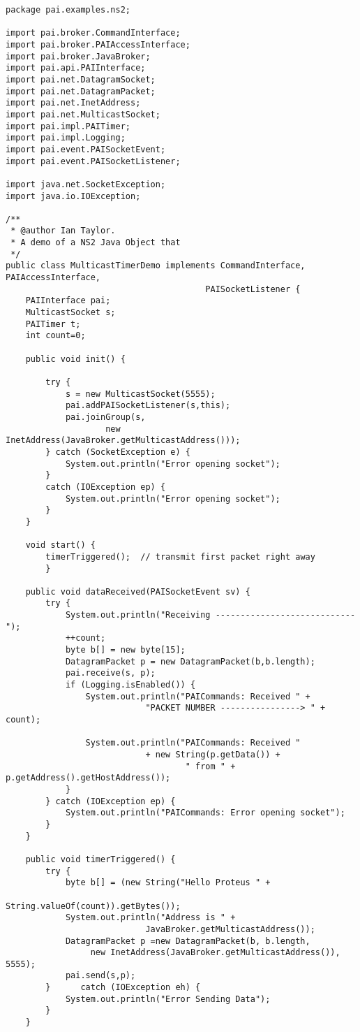 \footnotesize
\begin{verbatim}
package pai.examples.ns2;

import pai.broker.CommandInterface;
import pai.broker.PAIAccessInterface;
import pai.broker.JavaBroker;
import pai.api.PAIInterface;
import pai.net.DatagramSocket;
import pai.net.DatagramPacket;
import pai.net.InetAddress;
import pai.net.MulticastSocket;
import pai.impl.PAITimer;
import pai.impl.Logging;
import pai.event.PAISocketEvent;
import pai.event.PAISocketListener;

import java.net.SocketException;
import java.io.IOException;

/**
 * @author Ian Taylor.
 * A demo of a NS2 Java Object that
 */
public class MulticastTimerDemo implements CommandInterface, PAIAccessInterface,
                                        PAISocketListener {
    PAIInterface pai;
    MulticastSocket s;
    PAITimer t;
    int count=0;

    public void init() {

        try {
            s = new MulticastSocket(5555);
            pai.addPAISocketListener(s,this);
            pai.joinGroup(s, 
            		new InetAddress(JavaBroker.getMulticastAddress()));
        } catch (SocketException e) {
            System.out.println("Error opening socket");
        }
        catch (IOException ep) {
            System.out.println("Error opening socket");
        }
    }

    void start() {
   	    timerTriggered();  // transmit first packet right away
        }

    public void dataReceived(PAISocketEvent sv) {
        try {
            System.out.println("Receiving ----------------------------");
            ++count;
            byte b[] = new byte[15];
            DatagramPacket p = new DatagramPacket(b,b.length);
            pai.receive(s, p);
            if (Logging.isEnabled()) {
                System.out.println("PAICommands: Received " + 
                			"PACKET NUMBER ----------------> " + count);

                System.out.println("PAICommands: Received " 
                			+ new String(p.getData()) +
                        			" from " + p.getAddress().getHostAddress());
            }
        } catch (IOException ep) {
            System.out.println("PAICommands: Error opening socket");
        }
    }

    public void timerTriggered() {
        try {
            byte b[] = (new String("Hello Proteus " + 
                					String.valueOf(count)).getBytes());
            System.out.println("Address is " +  
                			JavaBroker.getMulticastAddress());
            DatagramPacket p =new DatagramPacket(b, b.length, 
                 new InetAddress(JavaBroker.getMulticastAddress()), 5555);
            pai.send(s,p);
        }      catch (IOException eh) {
            System.out.println("Error Sending Data");
        }
    }
    

\end{verbatim}
